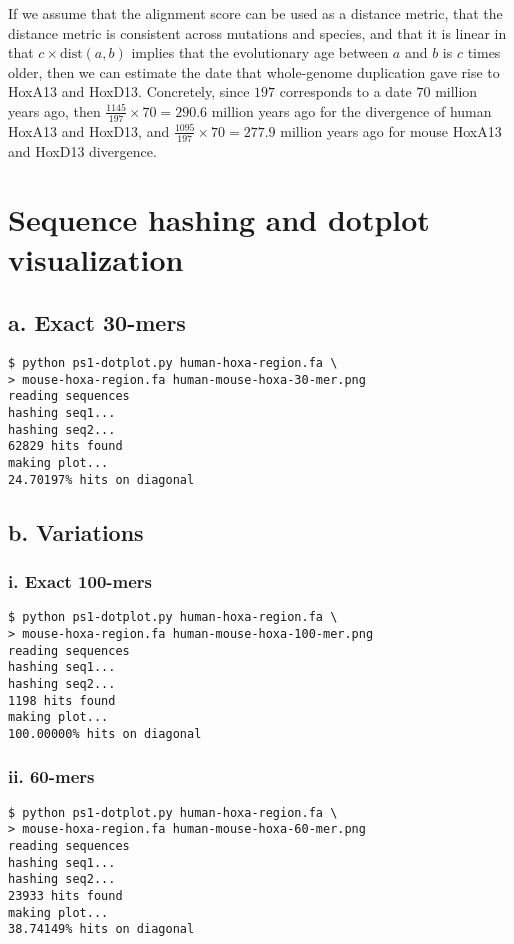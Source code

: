 \documentclass[a4paper]{article}
\begin{document}
If we assume that the alignment score can be used as a distance metric,
that the distance metric is consistent across mutations and species,
and that it is linear in that $c \times \text{dist}(a, b)$ implies that
the evolutionary age between $a$ and $b$ is $c$ times older, then
we can estimate the date that whole-genome duplication gave rise to HoxA13
and HoxD13. Concretely, since $197$ corresponds to a date $70$ million
years ago, then $\frac{1145}{197} \times 70 = 290.6$ million years ago
for the divergence of human HoxA13 and HoxD13, and
$\frac{1095}{197} \times 70 = 277.9$ million years ago for
mouse HoxA13 and HoxD13 divergence.

\section{Sequence hashing and dotplot visualization}

\subsection*{a. Exact 30-mers}

\begin{verbatim}
$ python ps1-dotplot.py human-hoxa-region.fa \
> mouse-hoxa-region.fa human-mouse-hoxa-30-mer.png
reading sequences
hashing seq1...
hashing seq2...
62829 hits found
making plot...
24.70197% hits on diagonal
\end{verbatim}

\subsection*{b. Variations}
\subsubsection*{i. Exact 100-mers}
\begin{verbatim}
$ python ps1-dotplot.py human-hoxa-region.fa \
> mouse-hoxa-region.fa human-mouse-hoxa-100-mer.png
reading sequences
hashing seq1...
hashing seq2...
1198 hits found
making plot...
100.00000% hits on diagonal
\end{verbatim}

\subsubsection*{ii. 60-mers}
\begin{verbatim}
$ python ps1-dotplot.py human-hoxa-region.fa \
> mouse-hoxa-region.fa human-mouse-hoxa-60-mer.png
reading sequences
hashing seq1...
hashing seq2...
23933 hits found
making plot...
38.74149% hits on diagonal
\end{verbatim}
\end{document}
